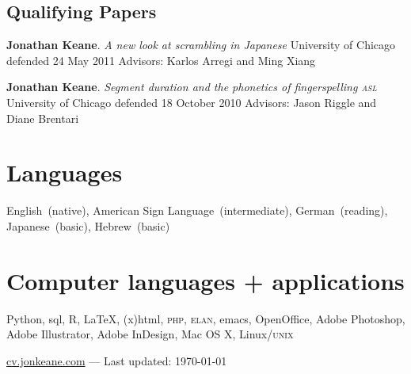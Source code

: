 \documentclass[10pt, letterpaper]{article}
\newcommand{\years}[1]{\marginpar{\scriptsize #1}}
\begin{document}
\vspace{2ex}
\subsection*{Qualifying Papers}
\begin{hangparas}{1em}{1}
\-\years{2011}\textbf{Jonathan Keane}. \textit{A new look at scrambling in Japanese} University of Chicago defended 24 May 2011 Advisors: Karlos Arregi and Ming Xiang
                                     
\-\years{2010}\textbf{Jonathan Keane}. \textit{Segment duration and the phonetics of fingerspelling {\textsc{asl}}} University of Chicago defended 18 October 2010 Advisors: Jason Riggle and Diane Brentari

\end{hangparas}
         

%
%

\section*{Languages}
\label{sec:languages}
English~(native), American Sign Language~(intermediate), German~(reading), Japanese~(basic), Hebrew~(basic)

\section*{Computer languages + applications}
\label{sec:computer}
Python, {\sc sql}, R, \LaTeX, {\sc (x)html}, \textsc{php}, \textsc{elan}, emacs, OpenOffice, Adobe Photoshop, Adobe Illustrator, Adobe InDesign, Mac OS X, Linux/\textsc{unix}

\vfill{}
\hrulefill
\begin{center}
{\footnotesize \href{http://cv.jonkeane.com}{cv.jonkeane.com} — Last updated: \isodate\today}
\end{center}
\end{document}
